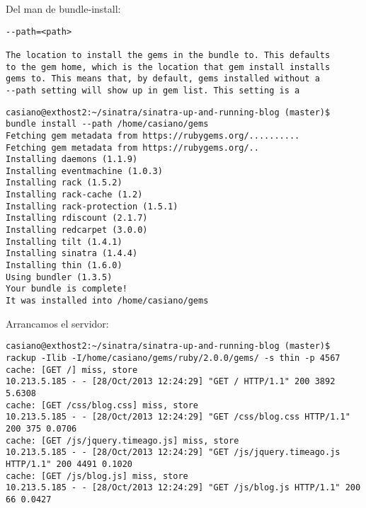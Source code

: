 Del man de bundle-install:
\begin{verbatim}
--path=<path>

The location to install the gems in the bundle to. This defaults
to the gem home, which is the location that gem install installs
gems to. This means that, by default, gems installed without a
--path setting will show up in gem list. This setting is a
\end{verbatim}

\begin{verbatim}
casiano@exthost2:~/sinatra/sinatra-up-and-running-blog (master)$ bundle install --path /home/casiano/gems
Fetching gem metadata from https://rubygems.org/..........
Fetching gem metadata from https://rubygems.org/..
Installing daemons (1.1.9) 
Installing eventmachine (1.0.3) 
Installing rack (1.5.2) 
Installing rack-cache (1.2) 
Installing rack-protection (1.5.1) 
Installing rdiscount (2.1.7) 
Installing redcarpet (3.0.0) 
Installing tilt (1.4.1) 
Installing sinatra (1.4.4) 
Installing thin (1.6.0) 
Using bundler (1.3.5) 
Your bundle is complete!
It was installed into /home/casiano/gems
\end{verbatim}

Arrancamos el servidor:
\begin{verbatim}
casiano@exthost2:~/sinatra/sinatra-up-and-running-blog (master)$ rackup -Ilib -I/home/casiano/gems/ruby/2.0.0/gems/ -s thin -p 4567
cache: [GET /] miss, store
10.213.5.185 - - [28/Oct/2013 12:24:29] "GET / HTTP/1.1" 200 3892 5.6308
cache: [GET /css/blog.css] miss, store
10.213.5.185 - - [28/Oct/2013 12:24:29] "GET /css/blog.css HTTP/1.1" 200 375 0.0706
cache: [GET /js/jquery.timeago.js] miss, store
10.213.5.185 - - [28/Oct/2013 12:24:29] "GET /js/jquery.timeago.js HTTP/1.1" 200 4491 0.1020
cache: [GET /js/blog.js] miss, store
10.213.5.185 - - [28/Oct/2013 12:24:29] "GET /js/blog.js HTTP/1.1" 200 66 0.0427
\end{verbatim}
